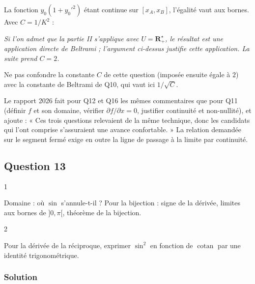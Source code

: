 \documentclass[11pt,a4paper]{article}
\newcommand{\equationajustee}[1]{%
  \sbox{\boiteequation}{$\displaystyle #1$}%
  \ifdim\wd\boiteequation>\linewidth
    \[\resizebox{\linewidth}{!}{\usebox{\boiteequation}}\]%
  \else
    \[#1\]%
  \fi}
\begin{document}
La fonction \(y_0(1+y_0'^2)\) étant continue sur \([x_A,x_B]\), l'égalité vaut aux bornes. Avec \(C=1/K^2\) :
\equationajustee{\boxed{\forall x\in[x_A,x_B],\quad y_0(x)\big(1+y_0'(x)^2\big)=C\qquad(C>0).}}

\emph{Si l'on admet que la partie II s'applique avec \(U=\mathbf R_+^\star\), le résultat est une application directe de Beltrami ; l'argument ci-dessus justifie cette application. La suite prend \(C=2\).}

\begin{piege}

Ne pas confondre la constante \(C\) de cette question (imposée ensuite égale à \(2\)) avec la constante de Beltrami de Q10, qui vaut ici \(1/\sqrt C\).

\end{piege}

\begin{jury}

Le rapport 2026 fait pour Q12 et Q16 les mêmes commentaires que pour Q11 (définir \(f\) et son domaine, vérifier \(\partial f/\partial x=0\), justifier continuité et non-nullité), et ajoute : « Ces trois questions relevaient de la même technique, donc les candidats qui l'ont comprise s'assuraient une avance confortable. » La relation demandée sur le segment fermé exige en outre la ligne de passage à la limite par continuité.

\end{jury}

\hypertarget{question-13}{%
\subsection{Question 13}\label{question-13}}

\begin{indication}{1}

Domaine : où \(\sin\) s'annule-t-il ? Pour la bijection : signe de la dérivée, limites aux bornes de \(]0,\pi[\), théorème de la bijection.

\end{indication}

\begin{indication}{2}

Pour la dérivée de la réciproque, exprimer \(\sin^2\) en fonction de \(\operatorname{cotan}\) par une identité trigonométrique.

\end{indication}

\hypertarget{solution-12}{%
\subsubsection{Solution}\label{solution-12}}
\end{document}
